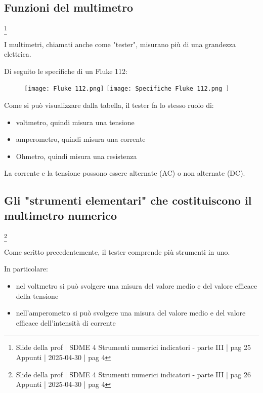 \newpage 

\subsection{Funzioni del multimetro}
\footnote{Slide della prof | SDME 4 Strumenti numerici indicatori - parte III | pag  25 \\  
Appunti | 2025-04-30 | pag 4} 

I multimetri, chiamati anche come "tester", misurano più di una grandezza elettrica. \newline 

Di seguito le specifiche di un Fluke 112: 

\begin{figure}[h]
    \centering
    \texttt{[image: Fluke 112.png]}
    \texttt{[image: Specifiche Fluke 112.png ]}
\end{figure}

Come si può visualizzare dalla tabella, il tester fa lo stesso ruolo di: 

\begin{itemize}
    \item voltmetro, quindi misura una tensione 
    \item amperometro, quindi misura una corrente 
    \item Ohmetro, quindi misura una resistenza
\end{itemize}

La corrente e la tensione possono essere alternate (AC) o non alternate (DC). \newline 

\newpage 

\subsection{Gli "strumenti elementari" che costituiscono il multimetro numerico}
\footnote{Slide della prof | SDME 4 Strumenti numerici indicatori - parte III | pag  26 \\  
Appunti | 2025-04-30 | pag 4} 

Come scritto precedentemente, il tester comprende più strumenti in uno. \newline 

In particolare: 

\begin{itemize}
    \item nel voltmetro si può svolgere una misura del valore medio e del valore efficace della tensione 
    \item nell'amperometro si può svolgere una misura del valore medio e del valore efficace dell'intensità di corrente
\end{itemize}

